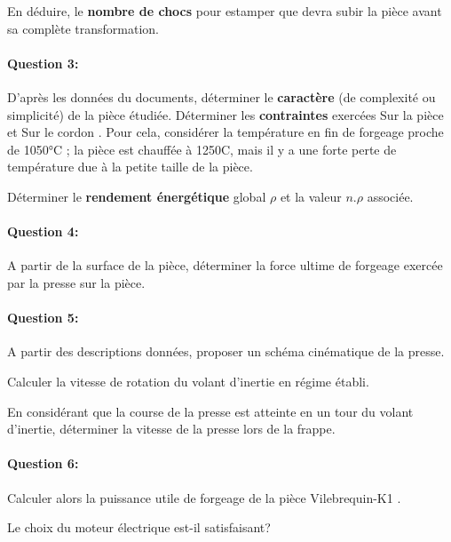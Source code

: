 En déduire, le \textbf{nombre de chocs} pour estamper que devra subir la pièce avant sa complète transformation.

\paragraph{Question 3:} D'après les données du documents, déterminer le \textbf{caractère} (de complexité ou simplicité) de la pièce étudiée. Déterminer les \textbf{contraintes} exercées \og Sur la pièce \fg et \og Sur le cordon \fg. Pour cela, considérer la température en fin de forgeage proche de 1050°C ; la pièce est chauffée à 1250\textdegree C, mais il y a une forte perte de température due à la petite taille de la pièce.

Déterminer le \textbf{rendement énergétique} global $\rho$ et la valeur $n.\rho$ associée.

\paragraph{Question 4:} A partir de la surface de la pièce, déterminer la force ultime de forgeage exercée par la presse sur la pièce.

\paragraph{Question 5:} A partir des descriptions données, proposer un schéma cinématique de la presse.

Calculer la vitesse de rotation du volant d'inertie en régime établi.

En considérant que la course de la presse est atteinte en un tour du volant d'inertie, déterminer la vitesse de la presse lors de la frappe.

\paragraph{Question 6:} Calculer alors la puissance utile de forgeage de la pièce \og Vilebrequin-K1 \fg.

Le choix du moteur électrique est-il satisfaisant?





\clearpage

\ifdef{\public}{}{}

\newpage

